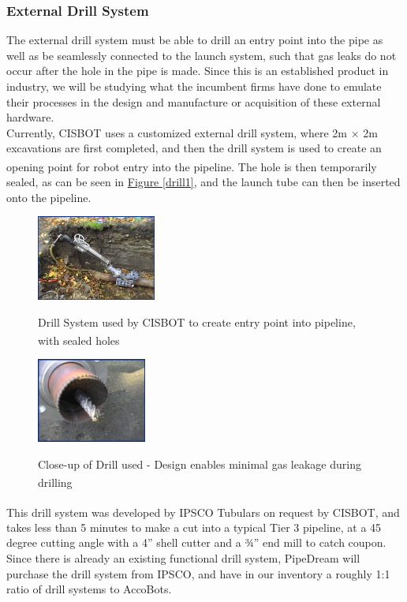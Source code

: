 \documentclass[11pt]{article}		%
\newcommand{\supercite}[1]{\textsuperscript{\cite{#1}}}		%
\newcommand{\figref}[1]{\hyperref[#1]{Figure \ref*{#1}}}    %
\begin{document}
		\subsubsection{External Drill System}
		The external drill system must be able to drill an entry point into the pipe as well as be seamlessly connected to the launch system, such that gas leaks do not occur after the hole in the pipe is made. Since this is an established product in industry, we will be studying what the incumbent firms have done to emulate their processes in the design and manufacture or acquisition of these external hardware.
        \\ \hspace*{3ex}Currently, CISBOT uses a customized external drill system, where 2m $\times$ 2m excavations are first completed, and then the drill system is used to create an opening point for robot entry into the pipeline\supercite{cisbotdrill}. The hole is then temporarily sealed, as can be seen in \figref{drill1}, and the launch tube can then be inserted onto the pipeline. 
        
				\begin{figure}[h]
				\centering
				\begin{multicols}{2}
				    \includegraphics[width = 0.35\textwidth]{drill1.jpg}
    				\caption{Drill System used by CISBOT to create entry point into pipeline, with sealed holes\supercite{drill1} }
    				\label{drill1}
    				\columnbreak
    				\includegraphics[width = 0.32\textwidth]{drill2.jpg}
    				\caption{Close-up of Drill used - Design enables minimal gas leakage during drilling\supercite{drill2}}
    				\label{drill2}
				\end{multicols}
			\end{figure}
			\vspace{-0.5cm}
		This drill system was developed by IPSCO Tubulars on request by CISBOT\supercite{IPSCO}, and takes less than 5 minutes to make a cut into a typical Tier 3 pipeline, at a 45 degree cutting angle with a 4” shell cutter and a ¾” end mill to catch coupon.
        \\ \hspace*{3ex}Since there is already an existing functional drill system, PipeDream will purchase the drill system from IPSCO, and have in our inventory a roughly 1:1 ratio of drill systems to AccoBots. 
\end{document}
